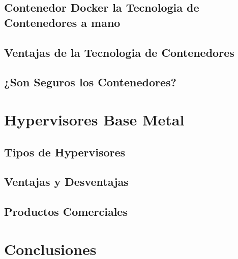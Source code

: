 \documentclass[%
 reprint,
 amsmath,amssymb,
 aps,
]{revtex4-1}
\begin{document}
\subsection{Contenedor Docker la Tecnologia de Contenedores a mano}
\subsection{Ventajas de la Tecnologia de Contenedores}
\subsection{¿Son Seguros los Contenedores?}

\section {Hypervisores Base Metal}\label{sec:7}


\subsection{Tipos de Hypervisores}
\subsection{Ventajas y Desventajas}
\subsection{Productos Comerciales}

\section{Conclusiones}\label{sec:8}
\end{document}
